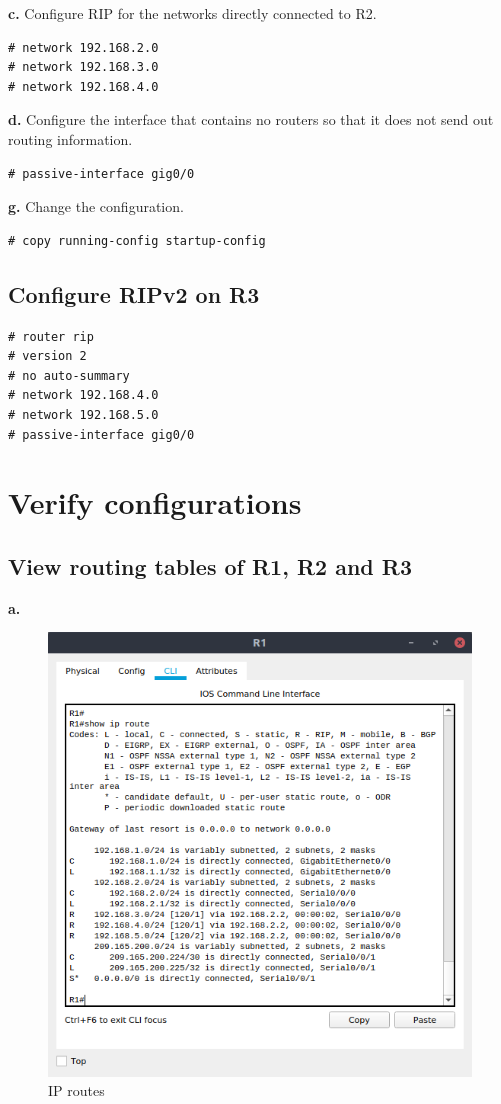 \documentclass[conference]{IEEEtran}
\begin{document}
\textbf{c.} Configure RIP for the networks directly connected to R2.
\begin{verbatim}
# network 192.168.2.0
# network 192.168.3.0
# network 192.168.4.0
\end{verbatim}

\textbf{d.} Configure the interface that contains no routers so that it does not send out routing information.
\begin{verbatim}
# passive-interface gig0/0
\end{verbatim}

\textbf{g.} Change the configuration.
\begin{verbatim}
# copy running-config startup-config
\end{verbatim}

\subsection{Configure RIPv2 on R3}

\begin{verbatim}
# router rip
# version 2
# no auto-summary
# network 192.168.4.0
# network 192.168.5.0
# passive-interface gig0/0
\end{verbatim}

\section{Verify configurations}

\subsection{View routing tables of R1, R2 and R3}

\textbf{a.}
\begin{center}
\begin{figure}[h]
\includegraphics[scale=0.45]{../q02a.png}
\caption{IP routes}
\end{figure}
\end{center}
\end{document}
